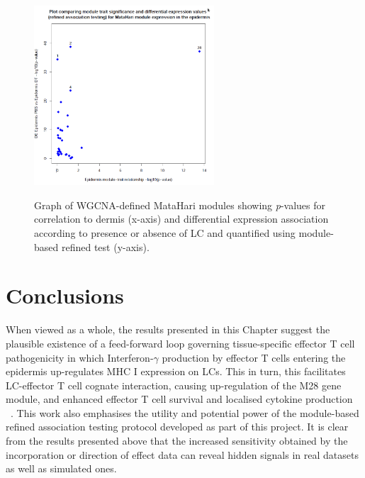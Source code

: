 \begin{figure}[H] 
    \centering
\includegraphics[width=0.6\textwidth]{Figures/Chapter5/Epidermis_trait_vs_DE.png}
    \label{fig:26}
\caption{\small{Graph of WGCNA-defined MataHari modules showing \textit{p}-values for correlation to dermis (x-axis) and differential expression association according to presence or absence of LC and quantified using module-based refined test (y-axis).} }
\end{figure}

\section{Conclusions}

When viewed as a whole, the results presented in this Chapter suggest the plausible existence of a feed-forward loop governing tissue-specific effector T cell pathogenicity in which Interferon-$\gamma$ production by effector T cells entering the epidermis up-regulates MHC I expression on LCs. This in turn, this facilitates LC-effector T cell cognate interaction, causing up-regulation of the M28 gene module, and enhanced effector T cell survival and localised cytokine production ~\autocite{Santos}. This work also emphasises the utility and potential power of the module-based refined association testing protocol developed as part of this project. It is clear from the results presented above that the increased sensitivity obtained by the incorporation or direction of effect data can reveal hidden signals in real datasets as well as simulated ones. 

